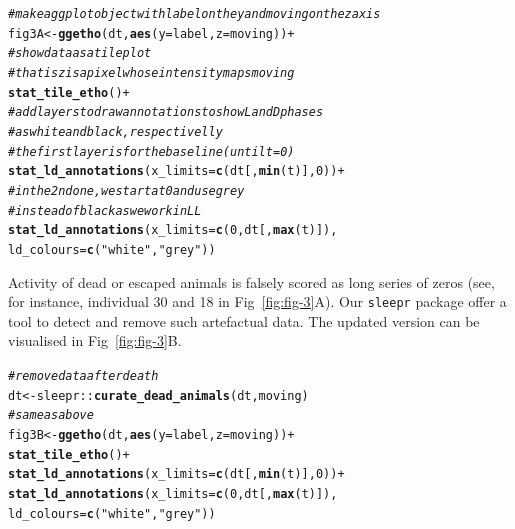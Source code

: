 \documentclass[10pt,letterpaper]{article}\usepackage[]{graphicx}\usepackage[]{color}
\makeatletter
\newcommand{\hlnum}[1]{\textcolor[rgb]{0.686,0.059,0.569}{#1}}%
\newcommand{\hlstr}[1]{\textcolor[rgb]{0.192,0.494,0.8}{#1}}%
\newcommand{\hlcom}[1]{\textcolor[rgb]{0.678,0.584,0.686}{\textit{#1}}}%
\newcommand{\hlopt}[1]{\textcolor[rgb]{0,0,0}{#1}}%
\newcommand{\hlstd}[1]{\textcolor[rgb]{0.345,0.345,0.345}{#1}}%
\newcommand{\hlkwb}[1]{\textcolor[rgb]{0.69,0.353,0.396}{#1}}%
\newcommand{\hlkwc}[1]{\textcolor[rgb]{0.333,0.667,0.333}{#1}}%
\newcommand{\hlkwd}[1]{\textcolor[rgb]{0.737,0.353,0.396}{\textbf{#1}}}%
\newenvironment{kframe}{%
 \def\at@end@of@kframe{}%
 \ifinner\ifhmode%
  \def\at@end@of@kframe{\end{minipage}}%
  \begin{minipage}{\columnwidth}%
 \fi\fi%
 \def\FrameCommand##1{\hskip\@totalleftmargin \hskip-\fboxsep
 \colorbox{shadecolor}{##1}\hskip-\fboxsep
     \hskip-\linewidth \hskip-\@totalleftmargin \hskip\columnwidth}%
 \MakeFramed {\advance\hsize-\width
   \@totalleftmargin\z@ \linewidth\hsize
   \@setminipage}}%
 {\par\unskip\endMakeFramed%
 \at@end@of@kframe}
\newenvironment{knitrout}{}{} %
\makeatother
\begin{document}
\begin{knitrout}
\color{fgcolor}\begin{kframe}
\begin{alltt}
\hlcom{# make a ggplot object with label on the y and moving on the z axis}
\hlstd{fig3A} \hlkwb{<-} \hlkwd{ggetho}\hlstd{(dt,} \hlkwd{aes}\hlstd{(}\hlkwc{y} \hlstd{= label,} \hlkwc{z} \hlstd{= moving))} \hlopt{+}
  \hlcom{# show data as a tile plot}
  \hlcom{# that is z is a pixel whose intensity maps moving}
  \hlkwd{stat_tile_etho}\hlstd{()} \hlopt{+}
  \hlcom{# add layers to draw annotations to show L and D phases}
  \hlcom{# as white and black, respectivelly}
  \hlcom{# the first layer is for the baseline (until t = 0)}
  \hlkwd{stat_ld_annotations}\hlstd{(}\hlkwc{x_limits} \hlstd{=} \hlkwd{c}\hlstd{(dt[,}\hlkwd{min}\hlstd{(t)],} \hlnum{0}\hlstd{))} \hlopt{+}
  \hlcom{# in the 2nd one, we start at 0 and use grey }
  \hlcom{# instead of black as we work in LL}
  \hlkwd{stat_ld_annotations}\hlstd{(}\hlkwc{x_limits} \hlstd{=} \hlkwd{c}\hlstd{(}\hlnum{0}\hlstd{, dt[,} \hlkwd{max}\hlstd{(t)]),}
                      \hlkwc{ld_colours} \hlstd{=} \hlkwd{c}\hlstd{(}\hlstr{"white"}\hlstd{,} \hlstr{"grey"}\hlstd{))}
\end{alltt}
\end{kframe}
\end{knitrout}

Activity of dead or escaped animals is falsely scored as long series of zeros (see, for instance, individual 30 and 18 in Fig~\ref{fig:fig-3}A).
Our \texttt{sleepr} package offer a tool to detect and remove such artefactual data.
The updated version can be visualised in Fig~\ref{fig:fig-3}B.

\begin{knitrout}
\color{fgcolor}\begin{kframe}
\begin{alltt}
\hlcom{# remove data after death}
\hlstd{dt} \hlkwb{<-} \hlstd{sleepr}\hlopt{::}\hlkwd{curate_dead_animals}\hlstd{(dt, moving)}
\hlcom{# same as above}
\hlstd{fig3B} \hlkwb{<-} \hlkwd{ggetho}\hlstd{(dt,} \hlkwd{aes}\hlstd{(}\hlkwc{y} \hlstd{= label,} \hlkwc{z} \hlstd{= moving))} \hlopt{+}
    \hlkwd{stat_tile_etho}\hlstd{()} \hlopt{+}
    \hlkwd{stat_ld_annotations}\hlstd{(}\hlkwc{x_limits} \hlstd{=} \hlkwd{c}\hlstd{(dt[,} \hlkwd{min}\hlstd{(t)],} \hlnum{0}\hlstd{))} \hlopt{+}
    \hlkwd{stat_ld_annotations}\hlstd{(}\hlkwc{x_limits} \hlstd{=} \hlkwd{c}\hlstd{(}\hlnum{0}\hlstd{, dt[,} \hlkwd{max}\hlstd{(t)]),}
                        \hlkwc{ld_colours} \hlstd{=} \hlkwd{c}\hlstd{(}\hlstr{"white"}\hlstd{,} \hlstr{"grey"}\hlstd{))}
\end{alltt}
\end{kframe}
\end{knitrout}
\end{document}
